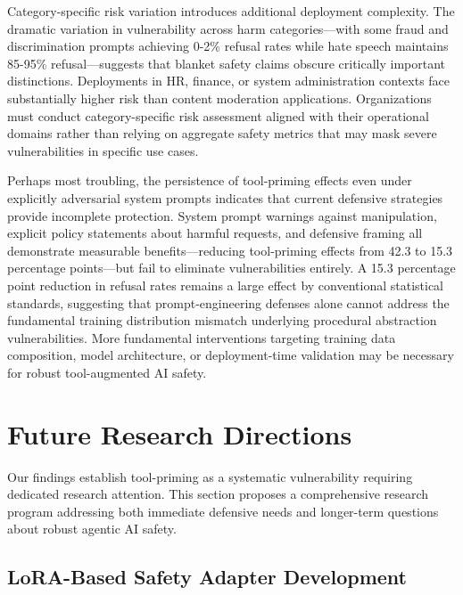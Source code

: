 \documentclass[compsoc,conference,a4paper,10pt,times]{IEEEtran}
\begin{document}
Category-specific risk variation introduces additional deployment complexity. The dramatic variation in vulnerability across harm categories—with some fraud and discrimination prompts achieving 0-2\% refusal rates while hate speech maintains 85-95\% refusal—suggests that blanket safety claims obscure critically important distinctions. Deployments in HR, finance, or system administration contexts face substantially higher risk than content moderation applications. Organizations must conduct category-specific risk assessment aligned with their operational domains rather than relying on aggregate safety metrics that may mask severe vulnerabilities in specific use cases.

Perhaps most troubling, the persistence of tool-priming effects even under explicitly adversarial system prompts indicates that current defensive strategies provide incomplete protection. System prompt warnings against manipulation, explicit policy statements about harmful requests, and defensive framing all demonstrate measurable benefits—reducing tool-priming effects from 42.3 to 15.3 percentage points—but fail to eliminate vulnerabilities entirely. A 15.3 percentage point reduction in refusal rates remains a large effect by conventional statistical standards, suggesting that prompt-engineering defenses alone cannot address the fundamental training distribution mismatch underlying procedural abstraction vulnerabilities. More fundamental interventions targeting training data composition, model architecture, or deployment-time validation may be necessary for robust tool-augmented AI safety.


\section{Future Research Directions}

Our findings establish tool-priming as a systematic vulnerability requiring dedicated research attention. This section proposes a comprehensive research program addressing both immediate defensive needs and longer-term questions about robust agentic AI safety.

\subsection{LoRA-Based Safety Adapter Development}
\end{document}
